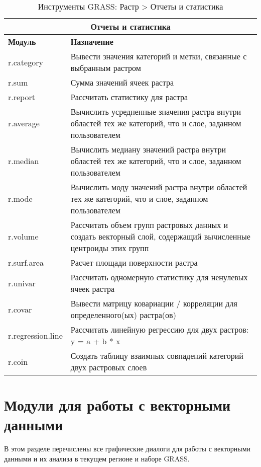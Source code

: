 {\renewcommand{\arraystretch}{0.7}
\begin{table}[H]
\centering
 \begin{tabular}{|p{4cm}|p{10cm}|}
  \hline \multicolumn{2}{|c|}{\textbf{Отчеты и статистика}} \\
  \hline \textbf{Модуль} & \textbf{Назначение} \\
  \hline r.category & Вывести значения категорий и метки, связанные с
  выбранным растром \\
  \hline r.sum & Сумма значений ячеек растра \\
  \hline r.report & Рассчитать статистику для растра \\
  \hline r.average & Вычислить усредненные значения растра внутри областей
  тех же категорий, что и слое, заданном пользователем \\
  \hline r.median & Вычислить медиану значений растра внутри областей тех
  же категорий, что и слое, заданном пользователем \\
  \hline r.mode & Вычислить моду значений растра внутри областей тех же
  категорий, что и слое, заданном пользователем \\
  \hline r.volume & Рассчитать объем групп растровых данных и создать
  векторный слой, содержащий вычисленные центроиды этих групп \\
  \hline r.surf.area & Расчет площади поверхности растра \\
  \hline r.univar & Рассчитать одномерную статистику для ненулевых ячеек
  растра \\
  \hline r.covar & Вывести матрицу ковариации / корреляции для
  определенного(ых) растра(ов) \\
  \hline r.regression.line & Рассчитать линейную регрессию для двух
  растров: y = a + b * x \\
  \hline r.coin & Создать таблицу взаимных совпадений категорий двух
  растровых слоев \\
\hline
\end{tabular}
\caption{Инструменты GRASS: Растр > Отчеты и статистика}
\end{table}}

\clearpage

\section{Модули для работы с векторными данными}

В этом разделе перечислены все графические диалоги для работы с
векторными данными и их анализа в текущем регионе и наборе GRASS.

